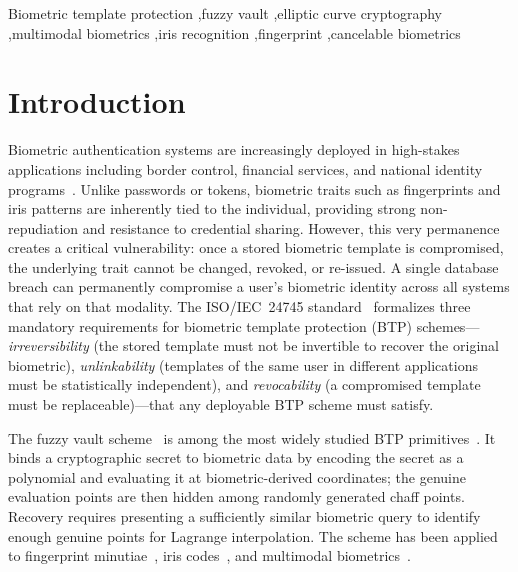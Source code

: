 \documentclass[3p,twocolumn]{elsarticle}
\begin{document}
\begin{frontmatter}
\begin{keyword}
Biometric template protection \sep fuzzy vault \sep elliptic curve cryptography \sep multimodal biometrics \sep iris recognition \sep fingerprint \sep cancelable biometrics
\end{keyword}

\end{frontmatter}


\section{Introduction}
\label{sec:introduction}

Biometric authentication systems are increasingly deployed in high-stakes applications including border control, financial services, and national identity programs~\cite{jain2004multibiometrics}. Unlike passwords or tokens, biometric traits such as fingerprints and iris patterns are inherently tied to the individual, providing strong non-repudiation and resistance to credential sharing. However, this very permanence creates a critical vulnerability: once a stored biometric template is compromised, the underlying trait cannot be changed, revoked, or re-issued. A single database breach can permanently compromise a user's biometric identity across all systems that rely on that modality. The ISO/IEC~24745 standard~\cite{iso24745} formalizes three mandatory requirements for biometric template protection (BTP) schemes---\emph{irreversibility} (the stored template must not be invertible to recover the original biometric), \emph{unlinkability} (templates of the same user in different applications must be statistically independent), and \emph{revocability} (a compromised template must be replaceable)---that any deployable BTP scheme must satisfy.

The fuzzy vault scheme~\cite{juels2002fuzzy} is among the most widely studied BTP primitives~\cite{rathgeb2011survey}. It binds a cryptographic secret to biometric data by encoding the secret as a polynomial and evaluating it at biometric-derived coordinates; the genuine evaluation points are then hidden among randomly generated chaff points. Recovery requires presenting a sufficiently similar biometric query to identify enough genuine points for Lagrange interpolation. The scheme has been applied to fingerprint minutiae~\cite{clancy2003secure,nandakumar2007fuzzy,uludag2005fuzzy}, iris codes~\cite{hao2006combining}, and multimodal biometrics~\cite{nandakumar2008multibiometric}.
\end{document}
